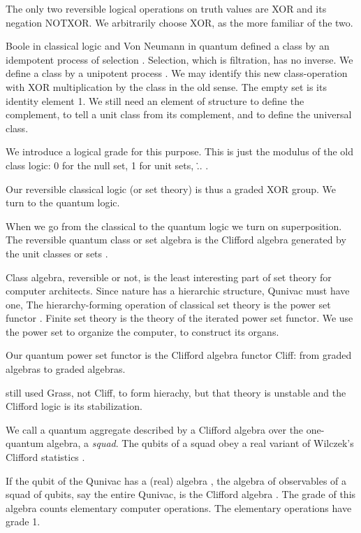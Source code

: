 \documentclass[a4paper,11pt]{article}
\def\3#1{{\mathcal #1}}
\begin{document}
The only two reversible logical operations
on truth values 
are XOR  
and its negation NOTXOR.
We
arbitrarily choose XOR, as the more familiar of the two.

Boole in classical logic and Von Neumann in quantum
defined a class by an idempotent  process of selection \coordHE{}.
Selection, which is filtration,
 has no inverse. 
We define a class by a unipotent process \coordHE{}.
We may identify this new class-operation
with XOR multiplication by the class in the old sense.
The empty set is its identity element 1.
We still need an element of structure
to define the complement,
to tell a unit class from its complement,
and
to define the universal class.

We introduce a logical grade for this purpose.
This is just the modulus of the old class logic:
0 for the null set, 1 for unit sets, \... .

Our reversible classical logic (or set theory)
 is thus a graded XOR group.
We turn to the quantum logic.

When we go from the classical to the quantum logic
we turn on superposition.
The reversible quantum class or set algebra
is the Clifford algebra
generated by the unit classes or sets  \cite{FINKELSTEIN1982}.

Class algebra, reversible or not,
is the least 
interesting part of set theory for computer architects.
Since nature has a hierarchic 
structure,
Qunivac must have one,
The hierarchy-forming
operation
of classical set theory
is the power set functor \myHighlight{$\3P: X\mapsto 2^X$}\coordHE{}. 
Finite set theory is the theory of the iterated power set functor.
We use the power set  to organize the computer,
to construct its organs.

Our quantum power set functor is
 the Clifford algebra functor Cliff: \coordHE{}
from graded algebras to graded algebras.

\cite{FINKELSTEIN1996} still used Grass, not 
Cliff, to form hierachy,
but that theory is unstable
and the Clifford logic is its stabilization.

We call a quantum aggregate described
by a Clifford algebra over 
the one-quantum algebra, a {\em squad}.
The qubits of a squad obey 
a real variant of Wilczek's Clifford statistics
\cite{WILCZEK1982,
NAYAK1996,WILCZEK1998}.


If the qubit of the Qunivac has
a (real) algebra \coordHE{},
the algebra of observables of a squad of qubits,
say the entire Qunivac,
is the Clifford algebra \coordHE{}\/.
The  grade of this algebra 
counts elementary computer operations.
The elementary operations have grade 1.
\end{document}
